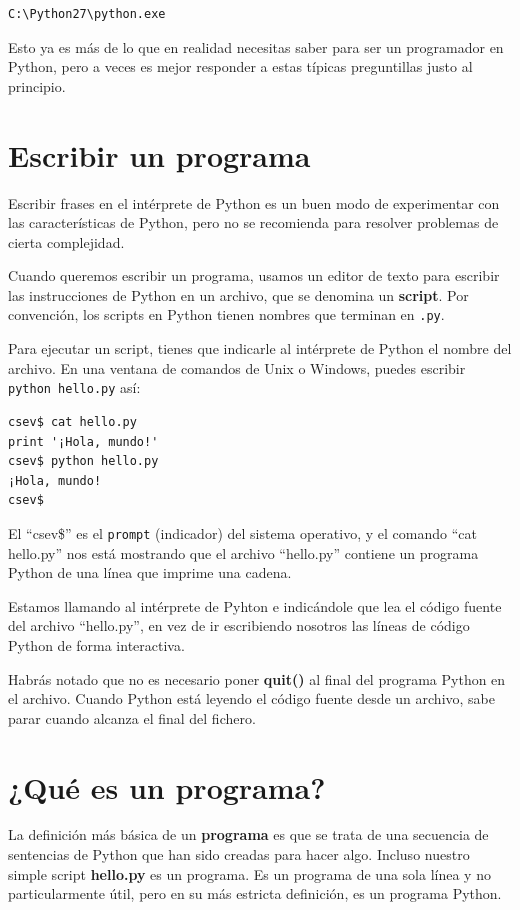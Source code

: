 \beforeverb
\begin{verbatim}
C:\Python27\python.exe
\end{verbatim}
\afterverb
%
Esto ya es más de lo que en realidad necesitas saber para ser un programador en Python,
pero a veces es mejor responder a estas típicas preguntillas justo
al principio.

\section{Escribir un programa}

Escribir frases en el intérprete de Python es un buen modo de experimentar
con las características de Python, pero no se recomienda para resolver problemas
de cierta complejidad.

Cuando queremos escribir un programa,
usamos un editor de texto para escribir las instrucciones de Python en un archivo,
que se denomina un {\bf script}. Por
convención, los scripts en Python tienen nombres que terminan en {\tt .py}.


Para ejecutar un script, tienes que indicarle al intérprete de Python
el nombre del archivo. En una ventana de comandos de Unix o Windows,
puedes escribir {\tt python hello.py} así:

\beforeverb
\begin{verbatim}
csev$ cat hello.py
print '¡Hola, mundo!'
csev$ python hello.py
¡Hola, mundo!
csev$
\end{verbatim}
\afterverb
%
El ``csev\$'' es el {\tt prompt} (indicador) del sistema operativo, y el comando ``cat hello.py'' nos
está mostrando que el archivo ``hello.py'' contiene un programa Python de una línea
que imprime una cadena.

Estamos llamando al intérprete de Pyhton e indicándole que lea el código fuente del
archivo ``hello.py'', en vez de ir escribiendo nosotros las líneas de código Python
de forma interactiva.

Habrás notado que no es necesario poner {\bf quit()} al final del programa
Python en el archivo. Cuando Python está leyendo el código fuente
desde un archivo, sabe parar cuando alcanza el final del fichero.

\section{¿Qué es un programa?}

La definición más básica de un {\bf programa} es que se trata de una
secuencia de sentencias de Python que han sido creadas para hacer algo.
Incluso nuestro simple script {\bf hello.py} es un programa. Es un programa
de una sola línea y no particularmente útil, pero en su más estricta definición,
es un programa Python. 

